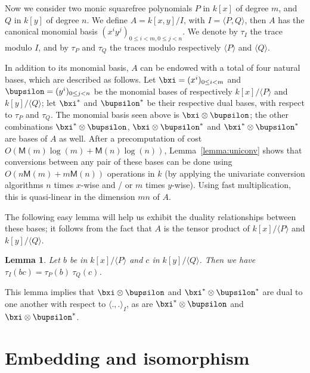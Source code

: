 \documentclass{sig-alternate}
\def\M {\ensuremath{\mathsf{M}}}
\newcounter{algo}
\newcommand{\ang}[1]{\langle#1\rangle}
\newtheorem{Lemma}{Lemma}
\begin{document}
\vspace{-1ex} Now we consider two monic
squarefree polynomials $P$ in $k[x]$ of degree $m$, and $Q$ in $k[y]$
of degree $n$. We define $A=k[x,y]/I$, with $I=\ang{P,Q}$,
then $A$ has the canonical monomial basis $(x^i y^j)_{0 \le i <m, 0
  \le j <
  n}$. %
We
denote by $\tau_I$ the trace modulo $I$, and by $\tau_P$ and $\tau_Q$
the traces modulo respectively $\ang{P}$ and $\ang{Q}$.

In addition to its monomial basis, $A$ can be endowed with a total of
four natural bases, which are described as follows. Let $\bxi=(x^i)_{0
  \le i < m}$ and $\bupsilon=(y^i)_{0 \le j < n}$ be the monomial
bases of respectively $k[x]/\ang{P}$ and $k[y]/\ang{Q}$; let
$\bxi^\ast$ and $\bupsilon^\ast$ be their respective dual bases, with
respect to $\tau_P$ and $\tau_Q$. The monomial basis seen above is
$\bxi \otimes \bupsilon$; the other combinations $\bxi^\ast \otimes
\bupsilon$, $\bxi \otimes \bupsilon^\ast$ and $\bxi^\ast \otimes
\bupsilon^\ast$ are bases of $A$ as well. After a precomputation of
cost $O(\M(m)\log(m) + \M(n)\log(n))$, Lemma~\ref{lemma:uniconv} shows
that conversions between any pair of these bases can be done using
$O(n\M(m)+m\M(n))$ operations in $k$ (by applying the univariate
conversion algorithms $n$ times $x$-wise and / or $m$ times
$y$-wise). Using fast multiplication, this is quasi-linear in the
dimension $mn$ of $A$.

The following easy lemma will help us exhibit the duality
relationships between these bases; it follows from the fact that $A$
is the tensor product of $k[x]/\ang{P}$ and $k[y]/\ang{Q}$.

\begin{Lemma}
  \label{lemma:traces:PQR1}
  Let $b$ be in $k[x]/\ang{P}$ and $c$ in $k[y]/\ang{Q}$. Then we have
  $\tau_I(bc) = \tau_P(b) \ \tau_Q(c)$.
\end{Lemma}
This lemma implies that $\bxi \otimes \bupsilon$ and $\bxi^\ast
\otimes \bupsilon^\ast$ are dual to one another with respect to
$\ang{.,.}_I$, as are $\bxi^\ast \otimes \bupsilon$ and $\bxi
\otimes \bupsilon^\ast$. 


\section{Embedding and isomorphism} \label{sec:emb-iso}
\end{document}
